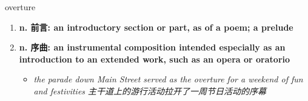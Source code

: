 
\begin{frame}
{\huge overture}
\begin{center}
\begin{enumerate}\Large
  \item \textbf{n. 前言: an introductory section or part, as of a poem; a prelude}
  \item \textbf{n. 序曲: an instrumental composition intended especially as an introduction to an extended work, such as an opera or oratorio}
  \begin{itemize}
    \item \em{\Large{the parade down Main Street served as the overture for a weekend of fun and festivities 主干道上的游行活动拉开了一周节日活动的序幕}}
  \end{itemize}
\end{enumerate}
\end{center}
\end{frame}
